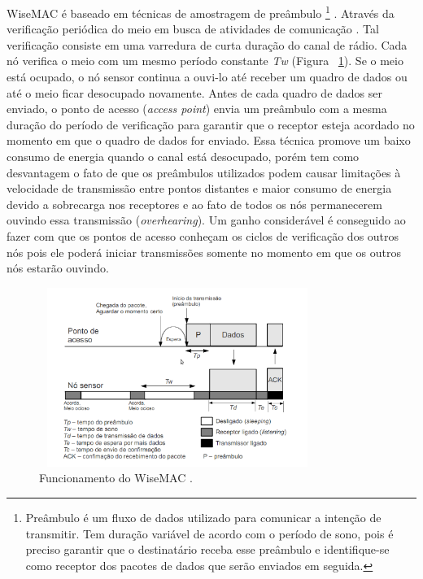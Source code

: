  WiseMAC é baseado em técnicas de amostragem de preâmbulo%
 \footnote{Preâmbulo é um fluxo de dados utilizado para comunicar a intenção de transmitir. Tem duração variável de acordo com o período de sono, pois é preciso garantir que o destinatário receba esse preâmbulo e identifique-se como receptor dos pacotes de dados que serão enviados em seguida.} 
. Através da verificação periódica do meio em busca de atividades de comunicação \cite{El-Hoiydi2004}. Tal verificação consiste em uma varredura de curta duração do canal de rádio. Cada nó verifica o meio com um mesmo período constante \textit{Tw} (Figura ~\ref{fig:wisemac}). Se o meio está ocupado, o nó sensor continua a ouvi-lo até receber um quadro de dados ou até o meio ficar desocupado novamente. Antes de cada quadro de dados ser enviado, o ponto de acesso (\textit{access point}) envia um preâmbulo com a mesma duração do período de verificação para garantir que o receptor esteja acordado no momento em que o quadro de dados for enviado. Essa técnica promove um baixo consumo de energia quando o canal está desocupado, porém tem como desvantagem o fato de que os preâmbulos utilizados podem causar limitações à velocidade de transmissão entre pontos distantes e maior consumo de energia devido a sobrecarga nos receptores e ao fato de todos os nós permanecerem ouvindo essa transmissão (\textit{overhearing}). Um ganho considerável é conseguido ao fazer com que os pontos de acesso conheçam os ciclos de verificação dos outros nós pois ele poderá iniciar transmissões somente no momento em que os outros nós estarão ouvindo.
 
\begin{figure}[!htb]
\centering
\includegraphics[width=340px,height=220px]{./Pictures/wisemac.png}
\caption{Funcionamento do WiseMAC \cite{El-Hoiydi2004}.} %
\label{fig:wisemac} %
\end{figure}

